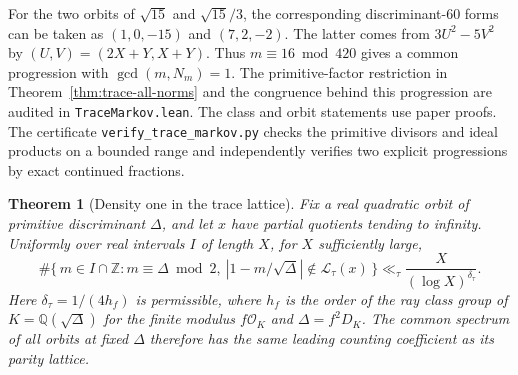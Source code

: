 \documentclass[11pt]{amsart}
\newtheorem{theorem}{Theorem}[section]
\theoremstyle{definition}
\theoremstyle{remark}
\numberwithin{equation}{section}
\newcommand{\Q}{\mathbb{Q}}
\newcommand{\Z}{\mathbb{Z}}
\begin{document}
For the two orbits of $\sqrt{15}$ and $\sqrt{15}/3$,
the corresponding discriminant-$60$ forms can be taken as
$(1,0,-15)$ and $(7,2,-2)$. The latter comes from
$3U^2-5V^2$ by $(U,V)=(2X+Y,X+Y)$.
Thus $m\equiv16\bmod 420$ gives a common progression
with $\gcd(m,N_m)=1$.
The primitive-factor restriction in
Theorem~\ref{thm:trace-all-norms} and the congruence behind
this progression are audited in \texttt{TraceMarkov.lean}.
The class and orbit statements use paper proofs. The
certificate \texttt{verify\_trace\_markov.py} checks the primitive
divisors and ideal products on a bounded range and independently
verifies two explicit progressions by exact continued fractions.


\begin{theorem}[Density one in the trace lattice]
\label{thm:trace-density-one}
Fix a real quadratic orbit of primitive discriminant $\Delta$,
and let $x$ have partial quotients tending to infinity.
Uniformly over real intervals $I$ of length $X$, for
$X$ sufficiently large,
\[
 \#\{\,m\in I\cap\Z: m\equiv\Delta\bmod 2,\ 
           |1-m/\sqrt\Delta|\notin\mathcal L_\tau(x)\,\}
       \ll_\tau \frac{X}{(\log X)^{\delta_\tau}}.
\]
Here $\delta_\tau=1/(4h_f)$ is permissible, where $h_f$ is
the order of the ray class group of $K=\Q(\sqrt\Delta)$ for
the finite modulus $f\mathcal O_K$ and $\Delta=f^2D_K$.
The common spectrum of all orbits at fixed $\Delta$ therefore
has the same leading counting coefficient as its parity lattice.
\end{theorem}
\end{document}
